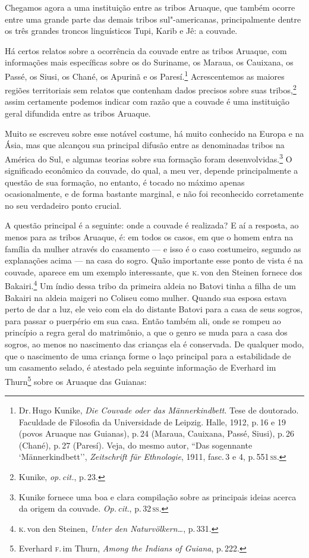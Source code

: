 Chegamos agora a uma instituição entre as tribos Aruaque, que também
ocorre entre uma grande parte das demais tribos sul"-americanas,
principalmente dentre os três grandes troncos linguísticos Tupi, Karib
e Jê: a couvade.

Há certos relatos sobre a ocorrência da couvade entre as tribos Aruaque,
com informações mais específicas sobre os do Suriname, os
Maraua, os Cauixana, os Passé, os Siusi, os Chané, os Apurinã e os
Paresí.\footnote{Dr.\,Hugo Kunike, \textit{Die Couvade oder das
  Männerkindbett}. Tese de doutorado. Faculdade de Filosofia da
  Universidade de Leipzig. Halle, 1912, p.\,16 e 19 (povos Aruaque nas
  Guianas), p.\,24 (Maraua, Cauixana, Passé, Siusi), p.\,26 (Chané), p.\,27
  (Paresí). Veja, do mesmo autor, ``Das sogennante `Männerkindbett'',
  \textit{Zeitschrift für Ethnologie}, 1911, fasc.\,3 e 4, p.\,551\,\textsc{ss}.}
Acrescentemos as maiores regiões territoriais sem relatos que contenham
dados precisos sobre suas tribos,\footnote{Kunike, \textit{op.\,cit.}, p.\,23.} assim certamente podemos indicar
com razão que a couvade é uma instituição geral difundida entre as
tribos Aruaque.

Muito se escreveu sobre esse notável costume, há muito conhecido
na Europa e na Ásia, mas que alcançou sua principal difusão entre
as denominadas tribos na América do Sul, e algumas teorias sobre sua
formação foram desenvolvidas.\footnote{Kunike fornece uma boa e clara
  compilação sobre as principais ideias acerca da origem da couvade. \textit{Op.\,cit}., p.\,32\,\textsc{ss}.} O significado econômico da couvade, do qual, a
meu ver, depende principalmente a questão de sua formação, no entanto, é tocado no
máximo apenas ocasionalmente, e de forma bastante marginal, e não foi
reconhecido corretamente no seu verdadeiro ponto crucial.

A questão principal é a seguinte: onde a couvade é realizada? E aí a
resposta, ao menos para as tribos Aruaque, é: em todos os casos, em que
o homem entra na família da mulher através do casamento --- e isso é o
caso costumeiro, segundo as explanações acima --- na casa do sogro. Quão
importante esse ponto de vista é na couvade, aparece em um exemplo
interessante, que \textsc{k}.\,von den Steinen fornece dos Bakairi.\footnote{\textsc{k}.\,von den Steinen, \textit{Unter den Naturvölkern\ldots}, p.\,331.} Um índio dessa tribo da primeira aldeia no Batovi tinha a filha
de um Bakairi na aldeia maigeri no Coliseu como mulher. Quando sua
esposa estava perto de dar a luz, ele veio com ela do distante Batovi
para a casa de seus sogros, para passar o puerpério em sua casa. Então
também ali, onde se rompeu ao princípio a regra geral do matrimônio, a
que o genro se muda para a casa dos sogros, ao menos no nascimento das
crianças ela é conservada. De qualquer modo, que o nascimento de uma
criança forme o laço principal para a estabilidade de um casamento
selado, é atestado pela seguinte informação de Everhard im
Thurn\footnote{Everhard \textsc{f}.\,im Thurn, \textit{Among the Indians of Guiana},
  p.\,222.} sobre os Aruaque das Guianas: 

